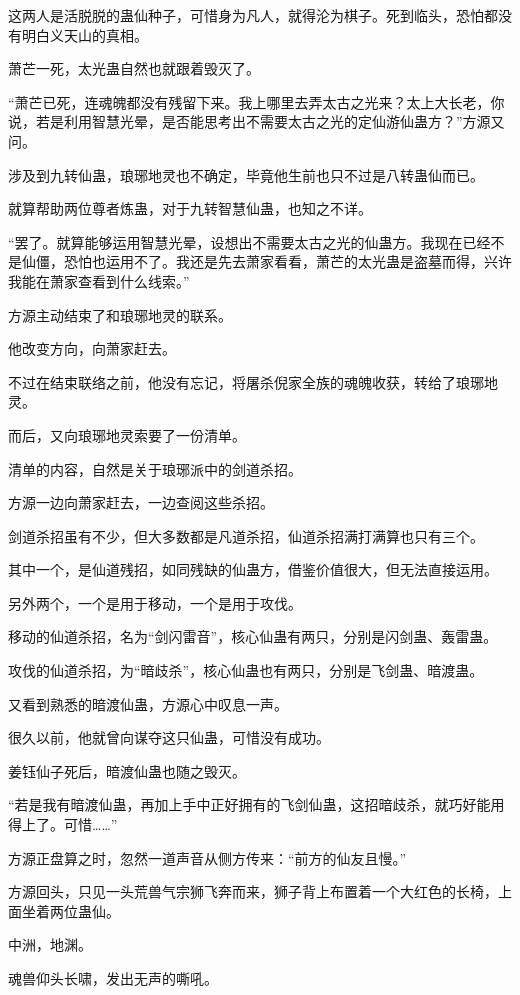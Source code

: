 \begin{this_body}
这两人是活脱脱的蛊仙种子，可惜身为凡人，就得沦为棋子。死到临头，恐怕都没有明白义天山的真相。

萧芒一死，太光蛊自然也就跟着毁灭了。

“萧芒已死，连魂魄都没有残留下来。我上哪里去弄太古之光来？太上大长老，你说，若是利用智慧光晕，是否能思考出不需要太古之光的定仙游仙蛊方？”方源又问。

涉及到九转仙蛊，琅琊地灵也不确定，毕竟他生前也只不过是八转蛊仙而已。

就算帮助两位尊者炼蛊，对于九转智慧仙蛊，也知之不详。

“罢了。就算能够运用智慧光晕，设想出不需要太古之光的仙蛊方。我现在已经不是仙僵，恐怕也运用不了。我还是先去萧家看看，萧芒的太光蛊是盗墓而得，兴许我能在萧家查看到什么线索。”

方源主动结束了和琅琊地灵的联系。

他改变方向，向萧家赶去。

不过在结束联络之前，他没有忘记，将屠杀倪家全族的魂魄收获，转给了琅琊地灵。

而后，又向琅琊地灵索要了一份清单。

清单的内容，自然是关于琅琊派中的剑道杀招。

方源一边向萧家赶去，一边查阅这些杀招。

剑道杀招虽有不少，但大多数都是凡道杀招，仙道杀招满打满算也只有三个。

其中一个，是仙道残招，如同残缺的仙蛊方，借鉴价值很大，但无法直接运用。

另外两个，一个是用于移动，一个是用于攻伐。

移动的仙道杀招，名为“剑闪雷音”，核心仙蛊有两只，分别是闪剑蛊、轰雷蛊。

攻伐的仙道杀招，为“暗歧杀”，核心仙蛊也有两只，分别是飞剑蛊、暗渡蛊。

又看到熟悉的暗渡仙蛊，方源心中叹息一声。

很久以前，他就曾向谋夺这只仙蛊，可惜没有成功。

姜钰仙子死后，暗渡仙蛊也随之毁灭。

“若是我有暗渡仙蛊，再加上手中正好拥有的飞剑仙蛊，这招暗歧杀，就巧好能用得上了。可惜……”

方源正盘算之时，忽然一道声音从侧方传来：“前方的仙友且慢。”

方源回头，只见一头荒兽气宗狮飞奔而来，狮子背上布置着一个大红色的长椅，上面坐着两位蛊仙。

中洲，地渊。

魂兽仰头长啸，发出无声的嘶吼。


\end{this_body}

